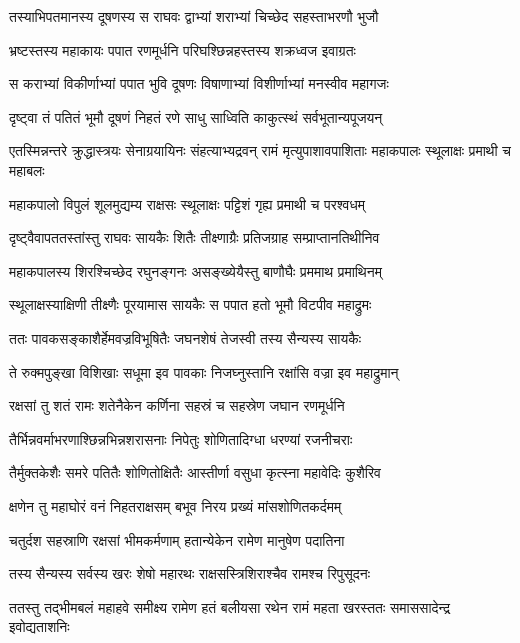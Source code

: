 \twolineshloka
{तस्याभिपतमानस्य दूषणस्य स राघवः}
{द्वाभ्यां शराभ्यां चिच्छेद सहस्ताभरणौ भुजौ} %

\twolineshloka
{भ्रष्टस्तस्य महाकायः पपात रणमूर्धनि}
{परिघश्छिन्नहस्तस्य शक्रध्वज इवाग्रतः} %

\twolineshloka
{स कराभ्यां विकीर्णाभ्यां पपात भुवि दूषणः}
{विषाणाभ्यां विशीर्णाभ्यां मनस्वीव महागजः} %

\twolineshloka
{दृष्ट्वा तं पतितं भूमौ दूषणं निहतं रणे}
{साधु साध्विति काकुत्स्थं सर्वभूतान्यपूजयन्} %

\threelineshloka
{एतस्मिन्नन्तरे क्रुद्धास्त्रयः सेनाग्रयायिनः}
{संहत्याभ्यद्रवन् रामं मृत्युपाशावपाशिताः}
{महाकपालः स्थूलाक्षः प्रमाथी च महाबलः} %

\twolineshloka
{महाकपालो विपुलं शूलमुद्यम्य राक्षसः}
{स्थूलाक्षः पट्टिशं गृह्य प्रमाथी च परश्वधम्} %

\twolineshloka
{दृष्ट्वैवापततस्तांस्तु राघवः सायकैः शितैः}
{तीक्ष्णाग्रैः प्रतिजग्राह सम्प्राप्तानतिथीनिव} %

\twolineshloka
{महाकपालस्य शिरश्चिच्छेद रघुनङ्गनः}
{असङ्ख्येयैस्तु बाणौघैः प्रममाथ प्रमाथिनम्} %

\twolineshloka
{स्थूलाक्षस्याक्षिणी तीक्ष्णैः पूरयामास सायकैः}
{स पपात हतो भूमौ विटपीव महाद्रुमः} %

\twolineshloka
{ततः पावकसङ्काशैर्हेमवज्रविभूषितैः}
{जघनशेषं तेजस्वी तस्य सैन्यस्य सायकैः} %

\twolineshloka
{ते रुक्मपुङ्खा विशिखाः सधूमा इव पावकाः}
{निजघ्नुस्तानि रक्षांसि वज्रा इव महाद्रुमान्} %

\twolineshloka
{रक्षसां तु शतं रामः शतेनैकेन कर्णिना}
{सहस्रं च सहस्रेण जघान रणमूर्धनि} %

\twolineshloka
{तैर्भिन्नवर्माभरणाश्छिन्नभिन्नशरासनाः}
{निपेतुः शोणितादिग्धा धरण्यां रजनीचराः} %

\twolineshloka
{तैर्मुक्तकेशैः समरे पतितैः शोणितोक्षितैः}
{आस्तीर्णा वसुधा कृत्स्ना महावेदिः कुशैरिव} %

\twolineshloka
{क्षणेन तु महाघोरं वनं निहतराक्षसम्}
{बभूव निरय प्रख्यं मांसशोणितकर्दमम्} %

\twolineshloka
{चतुर्दश सहस्राणि रक्षसां भीमकर्मणाम्}
{हतान्येकेन रामेण मानुषेण पदातिना} %

\twolineshloka
{तस्य सैन्यस्य सर्वस्य खरः शेषो महारथः}
{राक्षसस्त्रिशिराश्चैव रामश्च रिपुसूदनः} %

\fourlineindentedshloka
{ततस्तु तद्भीमबलं महाहवे}
{समीक्ष्य रामेण हतं बलीयसा}
{रथेन रामं महता खरस्ततः}
{समाससादेन्द्र इवोद्यताशनिः} %


